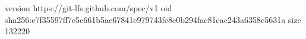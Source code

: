 version https://git-lfs.github.com/spec/v1
oid sha256:e7f35597ff7c5c661b5ac67841e979743fe8e0b294fac81eac243a6358e5631a
size 132220
